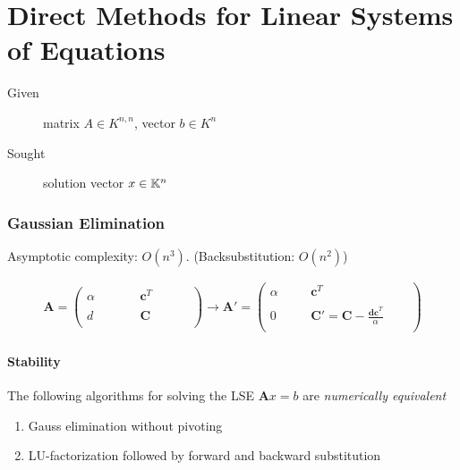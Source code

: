 \part{Direct Methods for Linear Systems of Equations}
	\begin{description}
	 \item[Given] matrix $A \in K^{n,n}$, vector $b \in K^n$
	 \item[Sought] solution vector $x\in \mathbb{K}^n$
	\end{description}
	
	\section{Gaussian Elimination}
		Asymptotic complexity: $O(n^3)$. (Backsubstitution: $O(n^2)$)
		
		\begin{align*}
		 \mathbf A = \begin{pmatrix}
		              \alpha & \qquad	& \mathbf c^T & \qquad 	\\
		              & \\
		              d 	 & 			& \mathbf C \\
							 & \qquad
		             \end{pmatrix}
		             \rightarrow
		 \mathbf A' = \begin{pmatrix}
		              \alpha & \quad	& \mathbf c^T & \quad 	\\
		              & \\
		              0 	 & 			& \mathbf C' = \mathbf C - \frac{\mathbf{dc}^T}{\alpha}\\
							 & \quad
		             \end{pmatrix}
		\end{align*}
		\subsection{Stability}
			\begin{lemma}
			  The following algorithms for solving the LSE $\mathbf Ax = b$ are \emph{numerically equivalent}
			  \begin{enumerate}
			   \item Gauss elimination without pivoting
			   \item LU-factorization followed by forward and backward substitution
			  \end{enumerate}
			\end{lemma}

